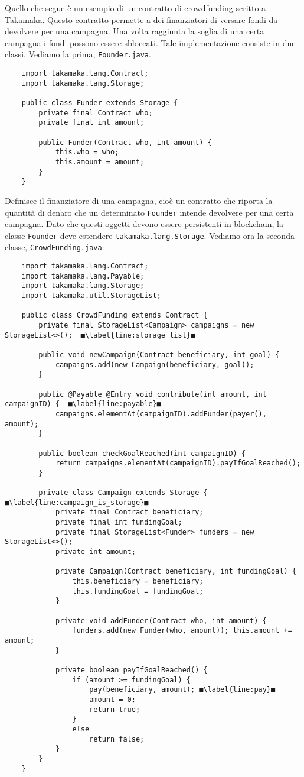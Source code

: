 Quello che segue è un esempio di un contratto di crowdfunding scritto a Takamaka. Questo contratto permette a dei finanziatori di versare fondi da devolvere per una campagna. Una volta raggiunta la soglia di una certa campagna i fondi possono essere sbloccati. Tale implementazione consiste in due classi. Vediamo la prima, \lstinline|Founder.java|.
%
\begin{lstlisting}
	import takamaka.lang.Contract;
	import takamaka.lang.Storage;
	
	public class Funder extends Storage {
		private final Contract who;
		private final int amount;
		
		public Funder(Contract who, int amount) {
			this.who = who;
			this.amount = amount;
		}
	}
\end{lstlisting}
%
Definisce il finanziatore di una campagna, cioè un contratto che riporta la quantità di denaro che un determinato \lstinline|Founder| intende devolvere per una certa campagna. Dato che questi oggetti devono essere persistenti in blockchain, la classe \lstinline|Founder| deve estendere \lstinline|takamaka.lang.Storage|. Vediamo ora la seconda classe, \lstinline|CrowdFunding.java|:
%
\begin{lstlisting}
	import takamaka.lang.Contract;
	import takamaka.lang.Payable;
	import takamaka.lang.Storage;
	import takamaka.util.StorageList;
	
	public class CrowdFunding extends Contract {
		private final StorageList<Campaign> campaigns = new StorageList<>();  ■\label{line:storage_list}■
		
		public void newCampaign(Contract beneficiary, int goal) {
			campaigns.add(new Campaign(beneficiary, goal));
		}
		
		public @Payable @Entry void contribute(int amount, int campaignID) {  ■\label{line:payable}■
			campaigns.elementAt(campaignID).addFunder(payer(), amount);
		}
		
		public boolean checkGoalReached(int campaignID) {
			return campaigns.elementAt(campaignID).payIfGoalReached();
		}
		
		private class Campaign extends Storage {  ■\label{line:campaign_is_storage}■
			private final Contract beneficiary;
			private final int fundingGoal;
			private final StorageList<Funder> funders = new StorageList<>();
			private int amount;
		
			private Campaign(Contract beneficiary, int fundingGoal) {
				this.beneficiary = beneficiary;
				this.fundingGoal = fundingGoal;
			}
		
			private void addFunder(Contract who, int amount) {
				funders.add(new Funder(who, amount)); this.amount += amount;
			}
		
			private boolean payIfGoalReached() {
				if (amount >= fundingGoal) {
					pay(beneficiary, amount); ■\label{line:pay}■
					amount = 0;
					return true;
				}
				else
					return false;
			}
		}
	}
\end{lstlisting}
